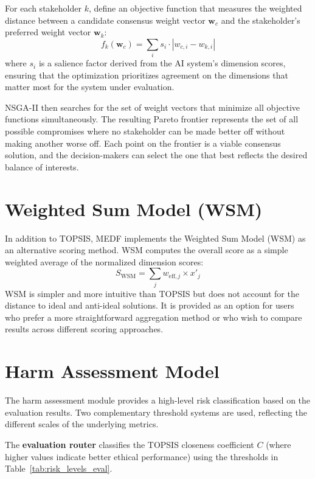 For each stakeholder $k$, define an objective function that measures the weighted distance between a candidate consensus weight vector $\mathbf{w}_c$ and the stakeholder's preferred weight vector $\mathbf{w}_k$:
\begin{equation}
  f_k(\mathbf{w}_c) = \sum_{i} s_i \cdot |w_{c,i} - w_{k,i}|
  \label{eq:pareto_obj}
\end{equation}
where $s_i$ is a salience factor derived from the AI system's dimension scores, ensuring that the optimization prioritizes agreement on the dimensions that matter most for the system under evaluation.

NSGA-II then searches for the set of weight vectors that minimize all objective functions simultaneously. The resulting Pareto frontier represents the set of all possible compromises where no stakeholder can be made better off without making another worse off. Each point on the frontier is a viable consensus solution, and the decision-makers can select the one that best reflects the desired balance of interests.

\section{Weighted Sum Model (WSM)}
\label{sec:wsm}

In addition to TOPSIS, MEDF implements the Weighted Sum Model (WSM) as an alternative scoring method. WSM computes the overall score as a simple weighted average of the normalized dimension scores:
\begin{equation}
  S_{\mathrm{WSM}} = \sum_{j} w_{\mathrm{eff},j} \times x'_j
  \label{eq:wsm}
\end{equation}
WSM is simpler and more intuitive than TOPSIS but does not account for the distance to ideal and anti-ideal solutions. It is provided as an option for users who prefer a more straightforward aggregation method or who wish to compare results across different scoring approaches.

\section{Harm Assessment Model}
\label{sec:harm}

The harm assessment module provides a high-level risk classification based on the evaluation results. Two complementary threshold systems are used, reflecting the different scales of the underlying metrics.

The \textbf{evaluation router} classifies the TOPSIS closeness coefficient $C$ (where higher values indicate better ethical performance) using the thresholds in Table~\ref{tab:risk_levels_eval}.

